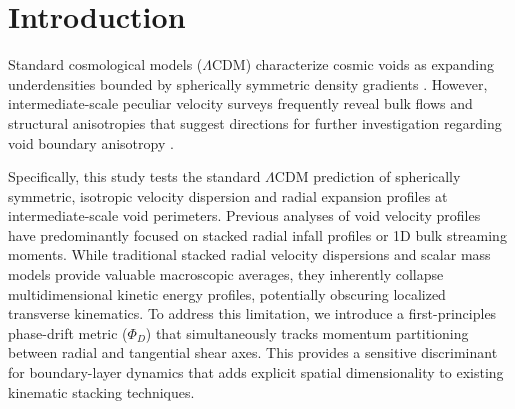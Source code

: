 \documentclass[trackchanges]{aastex631}
\begin{document}
\begin{abstract}
To test universality across cosmological epochs, we scale this framework to high-redshift ($z \le 0.5$) boundaries using the Dark Energy Spectroscopic Instrument (DESI) Data Release 1 Luminous Red Galaxy (LRG) catalog. DESI boundary shells reveal massive tracer densities (up to 2,798 galaxies per shell) and extreme principal tensor ratios (up to 418.26), suggesting triaxial anisotropy is a persistent structural property rather than local variance. Triaxial velocity dispersion tensors confirm pronounced anisotropy ($\lambda_1/\lambda_3$ up to 122.3 in local volumes), which robust Monte Carlo noise-injection simulations confirm cannot be generated by observational error in low-$N$ shells ($p < 0.0001$). While statistical power analysis confirms the post-filtering sample size is highly powered ($>90\%$ for effect size $\Delta\Phi_D \ge 0.35$), we emphasize this local $N=8$ sample serves as pilot local volume evidence; future integration with the Cosmicflows-5 catalog is flagged as essential for population-level confirmation. We evaluate these findings within the framework of standard non-linear gravitational dynamics, accounting for projection artifacts, Benjamini-Hochberg false discovery rate corrections, dual-baseline $H_0$ sensitivity, and cross-validation against watershed void-finding algorithms.
\end{abstract}


\section{Introduction}
Standard cosmological models ($\Lambda\text{CDM}$) characterize cosmic voids as expanding underdensities bounded by spherically symmetric density gradients \citep{hamaus2011, paillas2019}. However, intermediate-scale peculiar velocity surveys frequently reveal bulk flows and structural anisotropies that suggest directions for further investigation regarding void boundary anisotropy \citep{zaroubi2006}.

Specifically, this study tests the standard $\Lambda\text{CDM}$ prediction of spherically symmetric, isotropic velocity dispersion and radial expansion profiles at intermediate-scale void perimeters. Previous analyses of void velocity profiles have predominantly focused on stacked radial infall profiles or 1D bulk streaming moments. While traditional stacked radial velocity dispersions and scalar mass models provide valuable macroscopic averages, they inherently collapse multidimensional kinetic energy profiles, potentially obscuring localized transverse kinematics. To address this limitation, we introduce a first-principles phase-drift metric ($\Phi_D$) that simultaneously tracks momentum partitioning between radial and tangential shear axes. This provides a sensitive discriminant for boundary-layer dynamics that adds explicit spatial dimensionality to existing kinematic stacking techniques.
\end{document}
